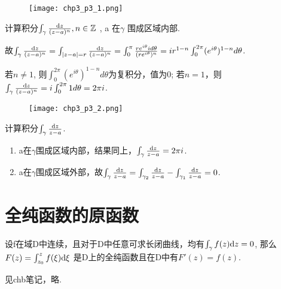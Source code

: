 \begin{figure}[h]
	\centering
	\texttt{[image: chp3\_p3\_1.png]}
\end{figure}
\begin{eg}
	计算积分$\int_\gamma \frac{\mathrm{d}z}{(z - a)^n}, n \in \mathbb{Z}$ , a 在$\gamma$ 围成区域内部.
\end{eg}
\begin{jie}{}
	
	故$\int_\gamma \frac{\mathrm{d}z}{(z-a)^n} = \int_{|z-a| = r} \frac{\mathrm{d}z}{(z-a) ^n}  = \int_0 ^ \pi \frac{r e ^{i \theta} i d \theta}{(re^{i \theta})^n} = i r^{1-n} \int_0^{2\pi} (e^{i\theta})^{1-n} d \theta$.
	
	若$n \neq 1$, 则$\int_0 ^{2\pi} (e^{i \theta})^{1-n} d\theta$为复积分，值为0;
	若$n=1$，则$\int_\gamma \frac{\mathrm{d}z}{(z - a)^n} = i \int_0 ^{2\pi} 1 d\theta = 2\pi i$.
\end{jie}


\begin{figure}[h]
	\centering
	\texttt{[image: chp3\_p3\_2.png]}
\end{figure}

\begin{eg}
	计算积分$\int_\gamma \frac{\mathrm{d}z}{z - a}$.
\end{eg}
\begin{jie}{}
	\begin{enumerate}[(1)]
		\item a在$\gamma$围成区域内部，结果同上，$\int_\gamma \frac{\mathrm{d}z}{z-a} = 2\pi i$.
		\item a在$\gamma$围成区域外部，故$\int_\gamma \frac{\mathrm{d}z}{z-a} = \int_{\gamma_2} \frac{\mathrm{d}z}{z -a} - \int_{\gamma_1} \frac{\mathrm{d}z}{z-a} = 0$.
	\end{enumerate}
\end{jie}


\section{全纯函数的原函数}
\begin{theorem}
	设f在域D中连续，且对于D中任意可求长闭曲线，均有$\int_\gamma f(z) \mathrm{d}z = 0$, 那么$F(z) = \int_{z_0}^{z} f(\xi) \mathrm{d}\xi$ 是D上的全纯函数且在D中有$F'(z) = f(z)$.
\end{theorem}
\begin{theorem}
	见chb笔记，略.
\end{theorem}





